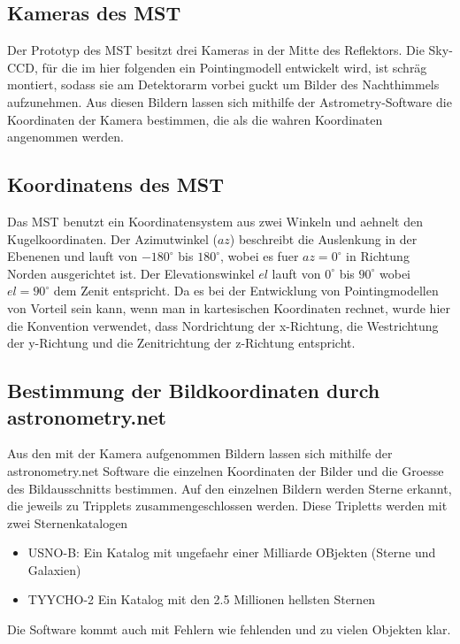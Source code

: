 \subsection{Kameras des MST}
Der Prototyp des MST besitzt drei Kameras in der Mitte des Reflektors. Die Sky-CCD, für die im hier folgenden ein Pointingmodell entwickelt wird, ist schräg montiert, sodass sie am Detektorarm vorbei guckt um Bilder des Nachthimmels aufzunehmen. Aus diesen Bildern lassen sich mithilfe der Astrometry-Software die Koordinaten der Kamera bestimmen, die als die wahren Koordinaten angenommen werden.

\subsection{Koordinatens des MST}
Das MST benutzt ein Koordinatensystem aus zwei Winkeln und aehnelt den Kugelkoordinaten. Der Azimutwinkel ($az$) beschreibt die Auslenkung in der Ebenenen und lauft von $-180^{\circ}$ bis $180^{\circ}$, wobei es fuer $az=0^{\circ}$ in Richtung Norden ausgerichtet ist. Der Elevationswinkel $el$ lauft von $0^{\circ}$ bis $90^{\circ}$ wobei $el=90^{\circ}$ dem Zenit entspricht. Da es bei der Entwicklung von Pointingmodellen von Vorteil sein kann, wenn man in kartesischen Koordinaten rechnet, wurde hier die Konvention verwendet, dass Nordrichtung der x-Richtung, die Westrichtung der y-Richtung und die Zenitrichtung der z-Richtung entspricht.

\subsection{Bestimmung der Bildkoordinaten durch astronometry.net}
Aus den mit der Kamera aufgenommen Bildern lassen sich mithilfe der astronometry.net Software die einzelnen Koordinaten der Bilder und die Groesse des Bildausschnitts bestimmen. Auf den einzelnen Bildern werden Sterne erkannt, die jeweils zu Tripplets zusammengeschlossen werden. Diese Tripletts werden mit zwei Sternenkatalogen 
\begin{itemize}
\item USNO-B: Ein Katalog mit ungefaehr einer Milliarde OBjekten (Sterne und Galaxien)
\item TYYCHO-2 Ein Katalog mit den 2.5 Millionen hellsten Sternen
\end{itemize}
Die Software kommt auch mit Fehlern wie fehlenden und zu vielen Objekten klar.
